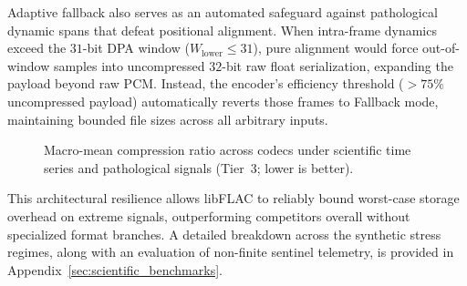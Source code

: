 \documentclass[10pt,twocolumn]{article}
\begin{document}
Adaptive fallback also serves as an automated safeguard against pathological dynamic spans that defeat positional alignment. When intra-frame dynamics exceed the $31$-bit DPA window ($W_{\text{lower}} \le 31$), pure alignment would force out-of-window samples into uncompressed $32$-bit raw float serialization, expanding the payload beyond raw PCM. Instead, the encoder's efficiency threshold ($>75\%$ uncompressed payload) automatically reverts those frames to Fallback mode, maintaining bounded file sizes across all arbitrary inputs.

\begin{figure}[!ht]
	\centering
	\caption{Macro-mean compression ratio across codecs under scientific time series and pathological signals (Tier~3; lower is better).}
	\label{fig:chart_scientific}
\end{figure}

This architectural resilience allows libFLAC to reliably bound worst-case storage overhead on extreme signals, outperforming competitors overall without specialized format branches. A detailed breakdown across the synthetic stress regimes, along with an evaluation of non-finite sentinel telemetry, is provided in Appendix~\ref{sec:scientific_benchmarks}.
\end{document}
